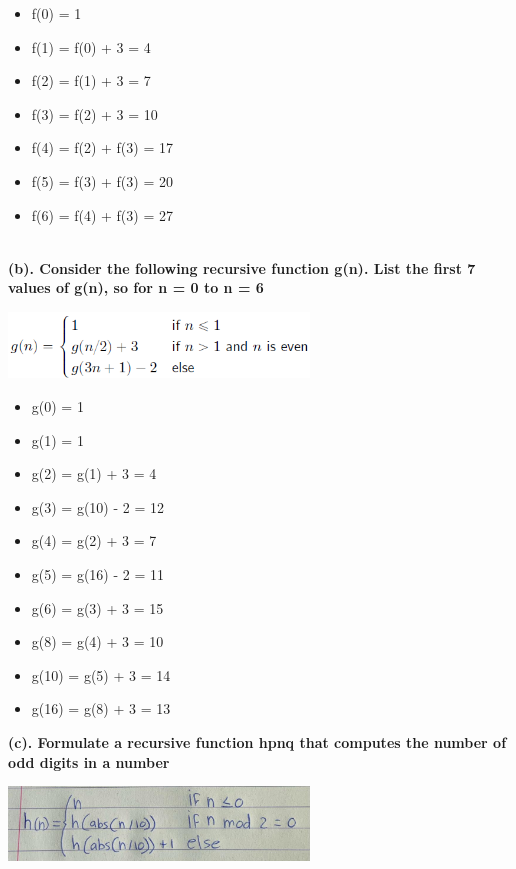 \documentclass[a4paper]{article}
\begin{document}
\begin{itemize}
    \item f(0) = 1
    \item f(1) = f(0) + 3 = 4
    \item f(2) = f(1) + 3 = 7
    \item f(3) = f(2) + 3 = 10
    \item f(4) = f(2) + f(3) = 17
    \item f(5) = f(3) + f(3) = 20
    \item f(6) = f(4) + f(3) = 27
\end{itemize}
\ \\

\textbf{(b). Consider the following recursive function g(n). List the first 7 values of g(n), so for n = 0 to n = 6}
\begin{center}
    \includegraphics[width=0.6\textwidth]{images/2b.png}\\[1cm]
\end{center}

\begin{itemize}
    \item g(0) = 1
    \item g(1) = 1
    \item g(2) = g(1) + 3 = 4
    \item g(3) = g(10) - 2 = 12
    \item g(4) = g(2) + 3 = 7
    \item g(5) = g(16) - 2 = 11
    \item g(6) = g(3) + 3 = 15
    \item g(8) = g(4) + 3 = 10
    \item g(10) = g(5) + 3 = 14
    \item g(16) = g(8) + 3 = 13
\end{itemize}

\newpage

\textbf{(c). Formulate a recursive function hpnq that computes the number of odd digits in a number}
\begin{center}
    \includegraphics[width=0.6\textwidth]{images/2c.jpeg}\\[1cm]
\end{center}
\end{document}
